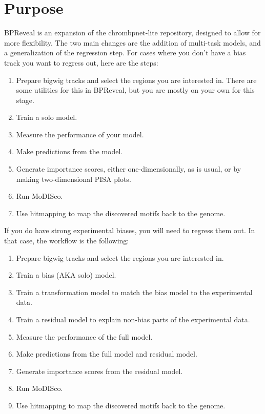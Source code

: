 \documentclass{article}
\begin{document}
\section{Purpose}
BPReveal is an expansion of the chrombpnet-lite repository, designed to allow for more flexibility. 
The two main changes are the addition of multi-task models, and a generalization of the regression step. 
For cases where you don't have a bias track you want to regress out, here are the steps: 
\begin{enumerate}
    \item Prepare bigwig tracks and select the regions you are interested in. There are some utilities for this in BPReveal, but you are mostly on your own for this stage. 
    \item Train a solo model. 
    \item Measure the performance of your model. 
    \item Make predictions from the model.
    \item Generate importance scores, either one-dimensionally, as is usual, or by making two-dimensional PISA plots. 
    \item Run MoDISco. 
    \item Use hitmapping to map the discovered motifs back to the genome.
\end{enumerate}

If you do have strong experimental biases, you will need to regress them out. In that case, the workflow is the following:

\begin{enumerate}
    \item Prepare bigwig tracks and select the regions you are interested in.  
    \item Train a bias (AKA solo) model. 
    \item Train a transformation model to match the bias model to the experimental data. 
    \item Train a residual model to explain non-bias parts of the experimental data. 
    \item Measure the performance of the full model. 
    \item Make predictions from the full model and residual model.
    \item Generate importance scores from the residual model. 
    \item Run MoDISco. 
    \item Use hitmapping to map the discovered motifs back to the genome.
\end{enumerate}
\end{document}
